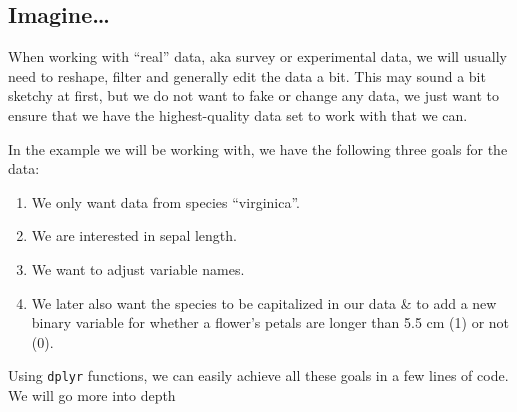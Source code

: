 \documentclass[
]{book}
\newenvironment{Shaded}{\begin{snugshade}}{\end{snugshade}}
\newcommand{\AttributeTok}[1]{\textcolor[rgb]{0.13,0.29,0.53}{#1}}
\newcommand{\CommentTok}[1]{\textcolor[rgb]{0.56,0.35,0.01}{\textit{#1}}}
\newcommand{\FunctionTok}[1]{\textcolor[rgb]{0.13,0.29,0.53}{\textbf{#1}}}
\newcommand{\NormalTok}[1]{#1}
\newcommand{\OtherTok}[1]{\textcolor[rgb]{0.56,0.35,0.01}{#1}}
\newcommand{\SpecialCharTok}[1]{\textcolor[rgb]{0.81,0.36,0.00}{\textbf{#1}}}
\newcommand{\StringTok}[1]{\textcolor[rgb]{0.31,0.60,0.02}{#1}}
\providecommand{\tightlist}{%
  \setlength{\itemsep}{0pt}\setlength{\parskip}{0pt}}
\begin{document}
\subsection*{Imagine\ldots{}}\label{imagine}

When working with ``real'' data, aka survey or experimental data, we will usually need to reshape, filter and generally edit the data a bit.
This may sound a bit sketchy at first, but we do not want to fake or change any data, we just want to ensure that we have the highest-quality data set to work with that we can.

In the example we will be working with, we have the following three goals for the data:

\begin{enumerate}
\def\labelenumi{\arabic{enumi}.}
\tightlist
\item
  We only want data from species ``virginica''.
\item
  We are interested in sepal length.
\item
  We want to adjust variable names.
\item
  We later also want the species to be capitalized in our data \& to add a new binary variable for whether a flower's petals are longer than 5.5 cm (1) or not (0).
\end{enumerate}

Using \texttt{dplyr} functions, we can easily achieve all these goals in a few lines of code.
We will go more into depth

\begin{Shaded}
\end{Shaded}
\end{document}
